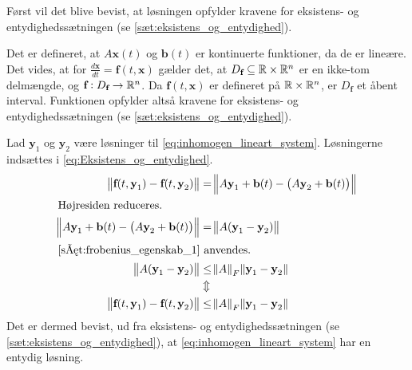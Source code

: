 \begin{bev} \textbf{} %
\newline
Først vil det blive bevist, at løsningen opfylder kravene for eksistens- og entydighedssætningen (se \autoref{sæt:eksistens_og_entydighed}). 

Det er defineret, at $A\textbf{x}(t)$ og $\textbf{b}(t)$ er kontinuerte funktioner, da de er lineære. Det vides, at for
$\displaystyle \frac{d\textbf{x}}{dt}=\textbf{f}(t,\textbf{x})$ gælder det, at $D_\textbf{f} \subseteq \mathbb{R} \times \mathbb{R}^n$ er en ikke-tom delmængde, og $\textbf{f}: D_\textbf{f} \to \mathbb{R}^n$. Da $\textbf{f}(t,\textbf{x})$ er defineret på $\mathbb{R} \times \mathbb{R}^{n}$, er $D_\textbf{f}$ et åbent interval. Funktionen opfylder altså kravene for eksistens- og entydighedssætningen (se \autoref{sæt:eksistens_og_entydighed}).

Lad $\textbf{y}_1$ og $\textbf{y}_2$ være løsninger til \eqref{eq:inhomogen_lineart_system}.
Løsningerne indsættes i \eqref{eq:Eksistens_og_entydighed}.
%
\begin{align*}
    \norm{\textbf{f}(t, \textbf{y}_1)-\textbf{f}(t, \textbf{y}_2)}
    &=\norm{A\textbf{y}_1+\textbf{b}(t)-\left(A\textbf{y}_2+\textbf{b}(t)\right)}\\
    \intertext{Højresiden reduceres.}
    \norm{A\textbf{y}_1+\textbf{b}(t)-\left(A\textbf{y}_2+\textbf{b}(t)\right)}&=\norm{A(\textbf{y}_1-\textbf{y}_2)}\\
    \intertext{\autoref{sæt:frobenius_egenskab_1} anvendes.}
    \norm{A(\textbf{y}_1-\textbf{y}_2)}&\leq\norm A _F \norm{\textbf{y}_1-\textbf{y}_2}\\
    &\Updownarrow\\
    \norm{\textbf{f}(t, \textbf{y}_1)-\textbf{f}(t, \textbf{y}_2)}&\leq \norm A _F \norm{\textbf{y}_1-\textbf{y}_2}
\end{align*}
Det er dermed bevist, ud fra eksistens- og entydighedssætningen (se \autoref{sæt:eksistens_og_entydighed}), at \eqref{eq:inhomogen_lineart_system} har en entydig løsning.


\end{bev}
